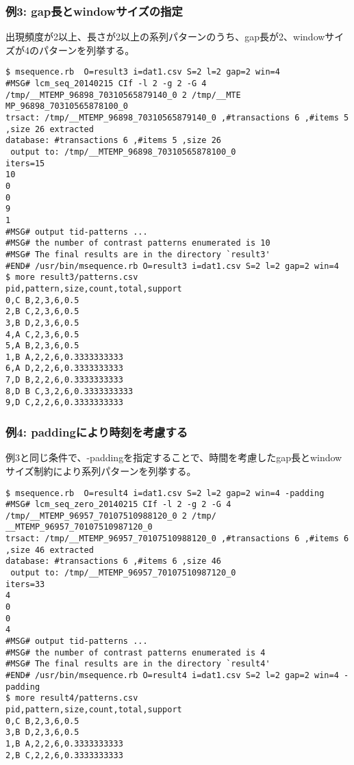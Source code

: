 \subsubsection*{例3: gap長とwindowサイズの指定}

出現頻度が2以上、長さが2以上の系列パターンのうち、gap長が2、windowサイズが4のパターンを列挙する。


\begin{Verbatim}[baselinestretch=0.7,frame=single]
$ msequence.rb  O=result3 i=dat1.csv S=2 l=2 gap=2 win=4
#MSG# lcm_seq_20140215 CIf -l 2 -g 2 -G 4 /tmp/__MTEMP_96898_70310565879140_0 2 /tmp/__MTE
MP_96898_70310565878100_0
trsact: /tmp/__MTEMP_96898_70310565879140_0 ,#transactions 6 ,#items 5 ,size 26 extracted 
database: #transactions 6 ,#items 5 ,size 26
 output to: /tmp/__MTEMP_96898_70310565878100_0
iters=15
10
0
0
9
1
#MSG# output tid-patterns ...
#MSG# the number of contrast patterns enumerated is 10
#MSG# The final results are in the directory `result3'
#END# /usr/bin/msequence.rb O=result3 i=dat1.csv S=2 l=2 gap=2 win=4
$ more result3/patterns.csv
pid,pattern,size,count,total,support
0,C B,2,3,6,0.5
2,B C,2,3,6,0.5
3,B D,2,3,6,0.5
4,A C,2,3,6,0.5
5,A B,2,3,6,0.5
1,B A,2,2,6,0.3333333333
6,A D,2,2,6,0.3333333333
7,D B,2,2,6,0.3333333333
8,D B C,3,2,6,0.3333333333
9,D C,2,2,6,0.3333333333
\end{Verbatim}
\subsubsection*{例4: paddingにより時刻を考慮する}

例3と同じ条件で、-paddingを指定することで、時間を考慮したgap長とwindowサイズ制約により系列パターンを列挙する。


\begin{Verbatim}[baselinestretch=0.7,frame=single]
$ msequence.rb  O=result4 i=dat1.csv S=2 l=2 gap=2 win=4 -padding
#MSG# lcm_seq_zero_20140215 CIf -l 2 -g 2 -G 4 /tmp/__MTEMP_96957_70107510988120_0 2 /tmp/
__MTEMP_96957_70107510987120_0
trsact: /tmp/__MTEMP_96957_70107510988120_0 ,#transactions 6 ,#items 6 ,size 46 extracted 
database: #transactions 6 ,#items 6 ,size 46
 output to: /tmp/__MTEMP_96957_70107510987120_0
iters=33
4
0
0
4
#MSG# output tid-patterns ...
#MSG# the number of contrast patterns enumerated is 4
#MSG# The final results are in the directory `result4'
#END# /usr/bin/msequence.rb O=result4 i=dat1.csv S=2 l=2 gap=2 win=4 -padding
$ more result4/patterns.csv
pid,pattern,size,count,total,support
0,C B,2,3,6,0.5
3,B D,2,3,6,0.5
1,B A,2,2,6,0.3333333333
2,B C,2,2,6,0.3333333333
\end{Verbatim}
